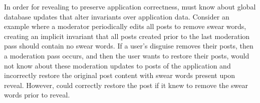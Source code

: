 In order for revealing to preserve application correctness, \sys must know about
global database updates that alter invariants over application data.
%
Consider an example where a moderator periodically edits all posts to remove
swear words, creating an implicit invariant that all posts created prior to the
last moderation pass should contain no swear words.
%
If a user's disguise removes their posts, then a moderation pass occurs, and
then the user wants to restore their posts, \sys would not know about these
moderation updates to posts of the application and incorrectly restore the
original post content with swear words present upon reveal.
%
However, \sys could correctly restore the post if it knew to remove the swear
words prior to reveal.
%
%
%

